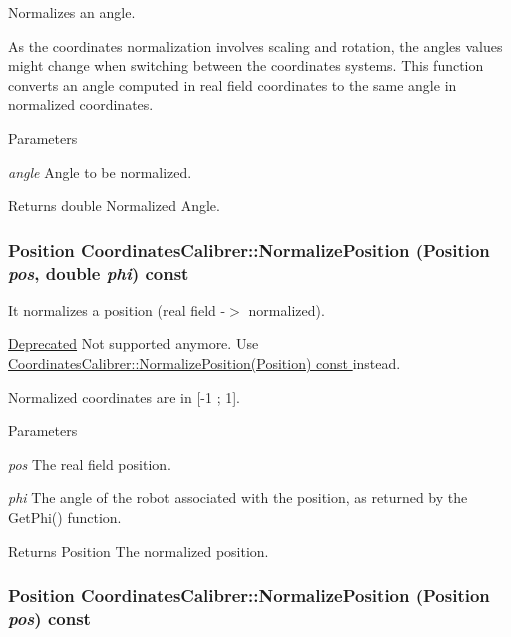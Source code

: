 Normalizes an angle. 

As the coordinates normalization involves scaling and rotation, the angles values might change when switching between the coordinates systems. This function converts an angle computed in real field coordinates to the same angle in normalized coordinates.


\begin{DoxyParams}{Parameters}
\item[{\em angle}]Angle to be normalized. \end{DoxyParams}
\begin{DoxyReturn}{Returns}
double Normalized Angle. 
\end{DoxyReturn}
\hypertarget{classCoordinatesCalibrer_a034180f011c23565b9b5907ce0219fbf}{
\subsubsection[{NormalizePosition}]{\setlength{\rightskip}{0pt plus 5cm}Position CoordinatesCalibrer::NormalizePosition (Position {\em pos}, \/  double {\em phi}) const}}
\label{classCoordinatesCalibrer_a034180f011c23565b9b5907ce0219fbf}


It normalizes a position (real field -\/$>$ normalized). 

\begin{Desc}
\item[\hyperlink{deprecated__deprecated000001}{Deprecated}]Not supported anymore. Use \hyperlink{classCoordinatesCalibrer_ad6519b69842756c256922d14d1e248ce}{CoordinatesCalibrer::NormalizePosition(Position) const }instead.\end{Desc}
Normalized coordinates are in \mbox{[}-\/1 ; 1\mbox{]}.


\begin{DoxyParams}{Parameters}
\item[{\em pos}]The real field position. \item[{\em phi}]The angle of the robot associated with the position, as returned by the GetPhi() function. \end{DoxyParams}
\begin{DoxyReturn}{Returns}
Position The normalized position. 
\end{DoxyReturn}
\hypertarget{classCoordinatesCalibrer_ad6519b69842756c256922d14d1e248ce}{
\subsubsection[{NormalizePosition}]{\setlength{\rightskip}{0pt plus 5cm}Position CoordinatesCalibrer::NormalizePosition (Position {\em pos}) const}}
\label{classCoordinatesCalibrer_ad6519b69842756c256922d14d1e248ce}


